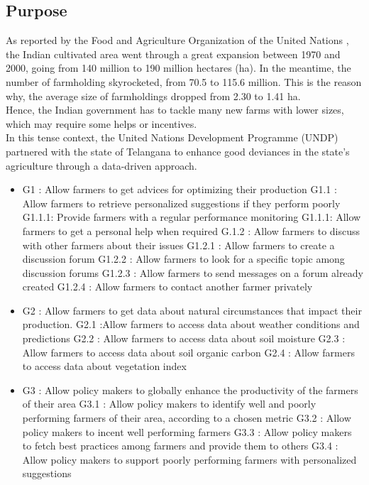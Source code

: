 \subsection{Purpose}
As reported by the Food and Agriculture Organization of the United Nations \cite{fao}, the Indian cultivated area went through a great expansion between 1970 and 2000, going from 140 million to 190 million hectares (ha). In the meantime, the number of farmholding skyrocketed, from 70.5 to 115.6 million. This is the reason why, the average size of farmholdings dropped from 2.30 to 1.41 ha. 
\\
Hence, the Indian government has to tackle many new farms with lower sizes, which may require some helps or incentives.
\\
In this tense context, the United Nations Development Programme (UNDP) partnered with the state of Telangana to enhance good deviances in the state's agriculture through a data-driven approach. 

\begin{itemize}
	\item
	G1 : Allow farmers to get advices for optimizing their production
	\subitem
	G1.1 : Allow farmers to retrieve personalized suggestions if they perform poorly
	\subsubitem
	G1.1.1: Provide farmers with a regular performance monitoring
	\subsubitem
	G1.1.1: Allow farmers to get a personal help when required
	\subitem
	G.1.2 : Allow farmers to discuss with other farmers about their issues
	\subsubitem
	G1.2.1 : Allow farmers to create a discussion forum
	\subsubitem
	G1.2.2 : Allow farmers to look for a specific topic among discussion forums
	\subsubitem
	G1.2.3 : Allow farmers to send messages on a forum already created
	\subsubitem
	G1.2.4 : Allow farmers to contact another farmer privately	
	\item
	G2 : Allow farmers to get data about natural circumstances that impact their production. 
	\subitem
	G2.1 :Allow farmers to access data about weather conditions and predictions
	\subitem
	G2.2 :
	Allow farmers to access data about soil moisture
	\subitem
	G2.3 :
	Allow farmers to access data about soil organic carbon
	\subitem
	G2.4 :
	Allow farmers to access data about vegetation index
	\item
	G3 : Allow policy makers to globally enhance the productivity of the farmers of their area
	\subitem
	G3.1 : Allow policy makers to identify well and poorly performing farmers of their area, according to a chosen metric
	\subitem
	G3.2 : Allow policy makers to incent well performing farmers
	\subitem
	G3.3 : Allow policy makers to fetch best practices among farmers and provide them to others
	\subitem
	G3.4 : Allow policy makers to support poorly performing farmers with personalized suggestions

	
\end{itemize}

